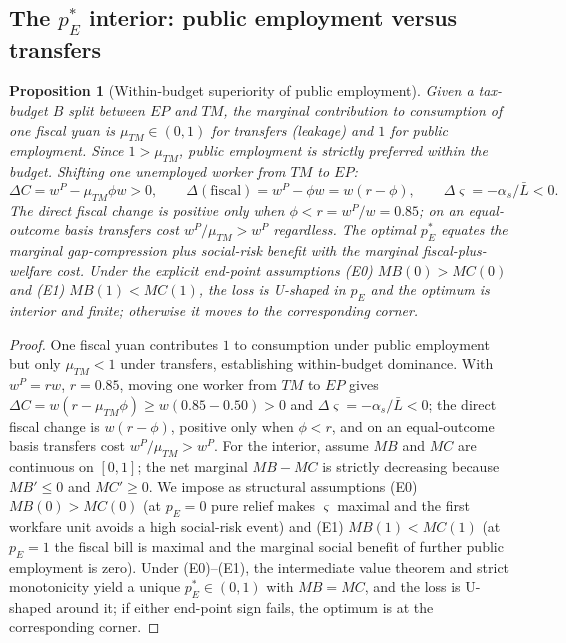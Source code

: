 \documentclass[review,12pt]{elsarticle}
\theoremstyle{plain}
\newtheorem{proposition}[theorem]{Proposition}
\theoremstyle{definition}
\theoremstyle{remark}
\newcommand{\barL}{\bar{L}}
\begin{document}
\subsection{The $p_E^*$ interior: public employment versus transfers}
\begin{proposition}[Within-budget superiority of public employment]
\label{prop4}
Given a tax-budget $B$ split between $EP$ and $TM$, the marginal contribution to consumption of one fiscal yuan is $\mu_{TM}\in(0,1)$ for transfers (leakage) and $1$ for public employment. Since $1>\mu_{TM}$, public employment is strictly preferred within the budget. Shifting one unemployed worker from $TM$ to $EP$:
\[
\Delta C=w^P-\mu_{TM}\phi w>0,\qquad
\Delta(\text{fiscal})=w^P-\phi w=w(r-\phi),\qquad
\Delta\varsigma=-\alpha_s/\barL<0.
\]
The direct fiscal change is positive only when $\phi<r=w^P/w=0.85$; on an equal-outcome basis transfers cost $w^P/\mu_{TM}>w^P$ regardless. The optimal $p_E^*$ equates the marginal gap-compression plus social-risk benefit with the marginal fiscal-plus-welfare cost. Under the explicit end-point assumptions (E0) $MB(0)>MC(0)$ and (E1) $MB(1)<MC(1)$, the loss is U-shaped in $p_E$ and the optimum is interior and finite; otherwise it moves to the corresponding corner.
\end{proposition}
\begin{proof}
One fiscal yuan contributes $1$ to consumption under public employment but only $\mu_{TM}<1$ under transfers, establishing within-budget dominance. With $w^P=rw$, $r=0.85$, moving one worker from $TM$ to $EP$ gives $\Delta C=w(r-\mu_{TM}\phi)\ge w(0.85-0.50)>0$ and $\Delta\varsigma=-\alpha_s/\bar L<0$; the direct fiscal change is $w(r-\phi)$, positive only when $\phi<r$, and on an equal-outcome basis transfers cost $w^P/\mu_{TM}>w^P$. For the interior, assume $MB$ and $MC$ are continuous on $[0,1]$; the net marginal $MB-MC$ is strictly decreasing because $MB'\le0$ and $MC'\ge0$. We impose as structural assumptions (E0) $MB(0)>MC(0)$ (at $p_E=0$ pure relief makes $\varsigma$ maximal and the first workfare unit avoids a high social-risk event) and (E1) $MB(1)<MC(1)$ (at $p_E=1$ the fiscal bill is maximal and the marginal social benefit of further public employment is zero). Under (E0)--(E1), the intermediate value theorem and strict monotonicity yield a unique $p_E^*\in(0,1)$ with $MB=MC$, and the loss is U-shaped around it; if either end-point sign fails, the optimum is at the corresponding corner.
\end{proof}
\end{document}
